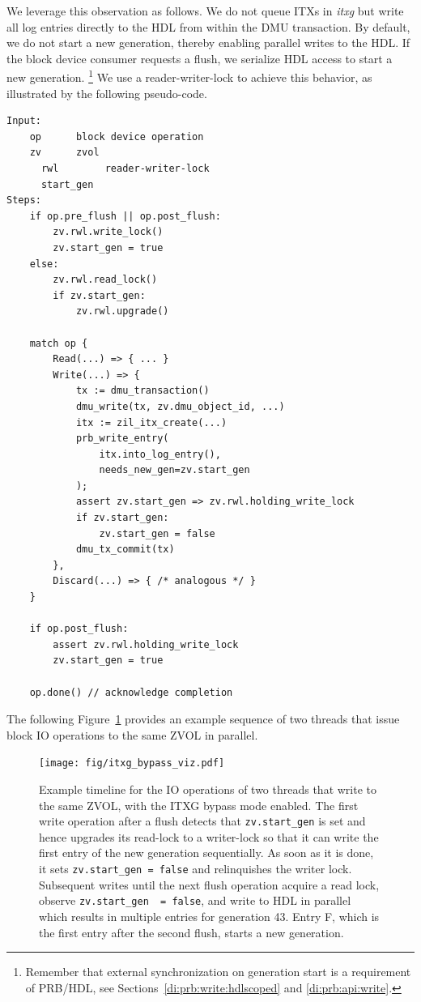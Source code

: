 \documentclass[12pt,a4paper,twoside]{book}
\begin{document}
We leverage this observation as follows.
We do not queue ITXs in \textit{itxg} but write all log entries directly to the HDL from within the DMU transaction.
By default, we do not start a new generation, thereby enabling parallel writes to the HDL.
If the block device consumer requests a flush, we serialize HDL access to start a new generation.%
\footnote{Remember that external synchronization on generation start is a requirement of PRB/HDL, see Sections~\ref{di:prb:write:hdlscoped} and \ref{di:prb:api:write}.}
We use a reader-writer-lock to achieve this behavior, as illustrated by the following pseudo-code.

\begin{lstlisting}[style=figurepseudocode]
Input:
    op      block device operation
    zv      zvol
      rwl        reader-writer-lock
      start_gen
Steps:
    if op.pre_flush || op.post_flush:
        zv.rwl.write_lock()
        zv.start_gen = true
    else:
        zv.rwl.read_lock()
        if zv.start_gen:
            zv.rwl.upgrade()

    match op {
        Read(...) => { ... }
        Write(...) => {
            tx := dmu_transaction()
            dmu_write(tx, zv.dmu_object_id, ...)
            itx := zil_itx_create(...)
            prb_write_entry(
                itx.into_log_entry(),
                needs_new_gen=zv.start_gen
            );
            assert zv.start_gen => zv.rwl.holding_write_lock
            if zv.start_gen:
                zv.start_gen = false
            dmu_tx_commit(tx)
        },
        Discard(...) => { /* analogous */ }
    }

    if op.post_flush:
        assert zv.rwl.holding_write_lock
        zv.start_gen = true

    op.done() // acknowledge completion
\end{lstlisting}

The following Figure~\ref{fig:itxg_bypass_viz} provides an example sequence of two threads that issue block IO operations to the same ZVOL in parallel.

\begin{figure}
    \centering
    \texttt{[image: fig/itxg\_bypass\_viz.pdf]}
    \caption{Example timeline for the IO operations of two threads that write to the same ZVOL, with the ITXG bypass mode enabled.
        The first write operation after a flush detects that \lstinline{zv.start_gen} is set and hence upgrades its read-lock to a writer-lock so that it can write the first entry of the new generation sequentially.
        As soon as it is done, it sets \lstinline{zv.start_gen = false} and relinquishes the writer lock.
        Subsequent writes until the next flush operation acquire a read lock, observe \lstinline{zv.start_gen  = false}, and write to HDL in parallel which results in multiple entries for generation 43.
        Entry F, which is the first entry after the second flush, starts a new generation.
    }
    \label{fig:itxg_bypass_viz}
\end{figure}
\end{document}
